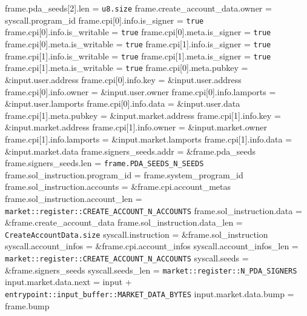 \begin{algorithm}
\begin{algorithmic}
  \STATE frame.pda\_seeds[2].len = \texttt{u8.size}
  \STATE frame.create\_account\_data.owner = syscall.program\_id
  \STATE frame.cpi[0].info.is\_signer = \texttt{true}
  \STATE frame.cpi[0].info.is\_writable = \texttt{true}
  \STATE frame.cpi[0].meta.is\_signer = \texttt{true}
  \STATE frame.cpi[0].meta.is\_writable = \texttt{true}
  \STATE frame.cpi[1].info.is\_signer = \texttt{true}
  \STATE frame.cpi[1].info.is\_writable = \texttt{true}
  \STATE frame.cpi[1].meta.is\_signer = \texttt{true}
  \STATE frame.cpi[1].meta.is\_writable = \texttt{true}
  \STATE frame.cpi[0].meta.pubkey = \&input.user.address
  \STATE frame.cpi[0].info.key = \&input.user.address
  \STATE frame.cpi[0].info.owner = \&input.user.owner
  \STATE frame.cpi[0].info.lamports = \&input.user.lamports
  \STATE frame.cpi[0].info.data = \&input.user.data
  \STATE frame.cpi[1].meta.pubkey = \&input.market.address
  \STATE frame.cpi[1].info.key = \&input.market.address
  \STATE frame.cpi[1].info.owner = \&input.market.owner
  \STATE frame.cpi[1].info.lamports = \&input.market.lamports
  \STATE frame.cpi[1].info.data = \&input.market.data
  \STATE frame.signers\_seeds.addr = \&frame.pda\_seeds
  \STATE frame.signers\_seeds.len = \texttt{frame.PDA\_SEEDS\_N\_SEEDS}
  \STATE frame.sol\_instruction.program\_id = frame.system\_program\_id
  \STATE frame.sol\_instruction.accounts = \&frame.cpi.account\_metas
  \STATE frame.sol\_instruction.account\_len =
    \texttt{market::register::CREATE\_ACCOUNT\_N\_ACCOUNTS}
  \STATE frame.sol\_instruction.data = \&frame.create\_account\_data
  \STATE frame.sol\_instruction.data\_len = \texttt{CreateAccountData.size}
  \STATE syscall.instruction = \&frame.sol\_instruction
  \STATE syscall.account\_infos = \&frame.cpi.account\_infos
  \STATE syscall.account\_infos\_len =
    \texttt{market::register::CREATE\_ACCOUNT\_N\_ACCOUNTS}
  \STATE syscall.seeds = \&frame.signers\_seeds
  \STATE syscall.seeds\_len = \texttt{market::register::N\_PDA\_SIGNERS}
  \STATE {}
  \STATE input.market.data.next = input + \texttt{entrypoint::input\_buffer::MARKET\_DATA\_BYTES}
  \STATE input.market.data.bump = frame.bump
\ENDPROCEDURE
\end{algorithmic}
\end{algorithm}
